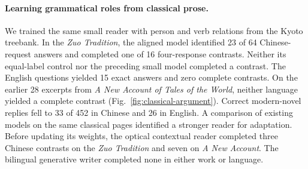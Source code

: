 \paragraph{Learning grammatical roles from classical prose.}
We trained the same small reader with person and verb relations from the Kyoto treebank. In the \textit{Zuo Tradition}, the aligned model identified 23 of 64 Chinese-request answers and completed one of 16 four-response contrasts. Neither its equal-label control nor the preceding small model completed a contrast. The English questions yielded 15 exact answers and zero complete contrasts. On the earlier 28 excerpts from \textit{A New Account of Tales of the World}, neither language yielded a complete contrast (Fig.~\ref{fig:classical-argument}). Correct modern-novel replies fell to 33 of 452 in Chinese and 26 in English. A comparison of existing models on the same classical pages identified a stronger reader for adaptation. Before updating its weights, the optical contextual reader completed three Chinese contrasts on the \textit{Zuo Tradition} and seven on \textit{A New Account}. The bilingual generative writer completed none in either work or language.
